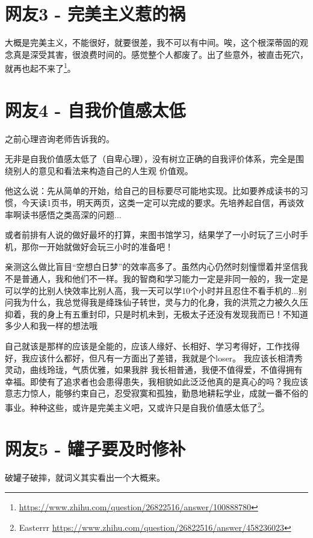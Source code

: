 \section{网友3 - 完美主义惹的祸}

大概是完美主义，不能很好，就要很差，我不可以有中间。唉，这个根深蒂固的观念真是深受其害，很浪费时间的。感觉整个人都废了。出了些意外，被直击死穴，就再也起不来了\footnote{\url{https://www.zhihu.com/question/26822516/answer/100888780}}。

\section{网友4 - 自我价值感太低}

之前心理咨询老师告诉我的。

无非是自我价值感太低了（自卑心理），没有树立正确的自我评价体系，完全是围绕别人的意见和看法来构造自己的人生观 价值观。

他这么说：先从简单的开始，给自己的目标要尽可能地实现。比如要养成读书的习惯，今天读1页书，明天两页，这类一定可以完成的要求。先培养起自信，再谈效率啊读书感悟之类高深的问题...

或者前排有人说的做好最坏的打算，来图书馆学习，结果学了一小时玩了三小时手机，那你一开始就做好会玩三小时的准备吧！

亲测这么做比盲目“空想白日梦”的效率高多了。虽然内心仍然时刻憧憬着并坚信我不是普通人，我和他们不一样。我的智商和学习能力一定是非同一般的，我一定是可以学的比别人快效率比别人高，我一天可以学10个小时并且忍住不看手机的...别问我为什么，我总觉得我是绛珠仙子转世，灵与力的化身，我的洪荒之力被久久压抑着，我的身上有五重封印，只是时机未到，无极太子还没有发现我而已！不知道多少人和我一样的想法哦

自己就该是那样的应该是全能的，应该人缘好、长相好、学习考得好，工作找得好，我应该什么都好，但凡有一方面出了差错，我就是个loser。 我应该长相清秀灵动，曲线玲珑，气质优雅，如果我胖 我长相普通，我便不值得爱，不值得拥有幸福。即使有了追求者也会患得患失，我相貌如此泛泛他真的是真心的吗？我应该意志力惊人，能够约束自己，忍受寂寞和孤独，勤恳地耕耘学业，成就一番不俗的事业。种种这些，或许是完美主义吧，又或许只是自我价值感太低了\footnote{Easterrr \quad \url{https://www.zhihu.com/question/26822516/answer/458236023}}。

\section{网友5 - 罐子要及时修补}

破罐子破摔，就词义其实看出一个大概来。

